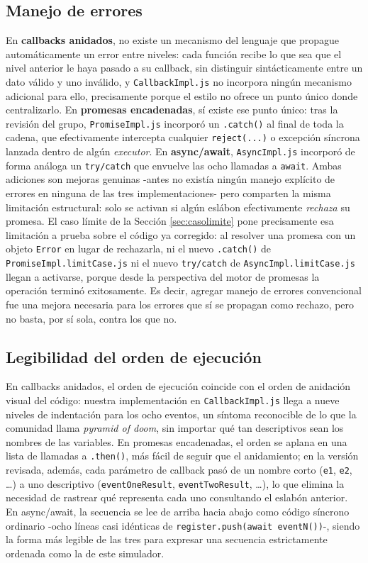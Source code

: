 \documentclass[conference,a4paper]{IEEEtran}
\begin{document}
\subsection{Manejo de errores}
En \textbf{callbacks anidados}, no existe un mecanismo del lenguaje que propague autom\'aticamente un error entre niveles: cada funci\'on recibe lo que sea que el nivel anterior le haya pasado a su callback, sin distinguir sint\'acticamente entre un dato v\'alido y uno inv\'alido, y \texttt{CallbackImpl.js} no incorpora ning\'un mecanismo adicional para ello, precisamente porque el estilo no ofrece un punto \'unico donde centralizarlo. En \textbf{promesas encadenadas}, s\'i existe ese punto \'unico: tras la revisi\'on del grupo, \texttt{PromiseImpl.js} incorpor\'o un \texttt{.catch()} al final de toda la cadena, que efectivamente intercepta cualquier \texttt{reject(...)} o excepci\'on s\'incrona lanzada dentro de alg\'un \textit{executor}. En \textbf{async/await}, \texttt{AsyncImpl.js} incorpor\'o de forma an\'aloga un \texttt{try/catch} que envuelve las ocho llamadas a \texttt{await}. Ambas adiciones son mejoras genuinas -antes no exist\'ia ning\'un manejo expl\'icito de errores en ninguna de las tres implementaciones- pero comparten la misma limitaci\'on estructural: solo se activan si alg\'un esl\'abon efectivamente \emph{rechaza} su promesa. El caso l\'imite de la Secci\'on \ref{sec:casolimite} pone precisamente esa limitaci\'on a prueba sobre el c\'odigo ya corregido: al resolver una promesa con un objeto \texttt{Error} en lugar de rechazarla, ni el nuevo \texttt{.catch()} de \texttt{PromiseImpl.limitCase.js} ni el nuevo \texttt{try/catch} de \texttt{AsyncImpl.limitCase.js} llegan a activarse, porque desde la perspectiva del motor de promesas la operaci\'on termin\'o exitosamente. Es decir, agregar manejo de errores convencional fue una mejora necesaria para los errores que s\'i se propagan como rechazo, pero no basta, por s\'i sola, contra los que no.

\subsection{Legibilidad del orden de ejecuci\'on}
En callbacks anidados, el orden de ejecuci\'on coincide con el orden de anidaci\'on visual del c\'odigo: nuestra implementaci\'on en \texttt{CallbackImpl.js} llega a nueve niveles de indentaci\'on para los ocho eventos, un s\'intoma reconocible de lo que la comunidad llama \textit{pyramid of doom}, sin importar qu\'e tan descriptivos sean los nombres de las variables. En promesas encadenadas, el orden se aplana en una lista de llamadas a \texttt{.then()}, m\'as f\'acil de seguir que el anidamiento; en la versi\'on revisada, adem\'as, cada par\'ametro de callback pas\'o de un nombre corto (\texttt{e1}, \texttt{e2}, \dots) a uno descriptivo (\texttt{eventOneResult}, \texttt{eventTwoResult}, \dots), lo que elimina la necesidad de rastrear qu\'e representa cada uno consultando el eslab\'on anterior. En async/await, la secuencia se lee de arriba hacia abajo como c\'odigo s\'incrono ordinario -ocho l\'ineas casi id\'enticas de \texttt{register.push(await eventN())}-, siendo la forma m\'as legible de las tres para expresar una secuencia estrictamente ordenada como la de este simulador.
\end{document}
